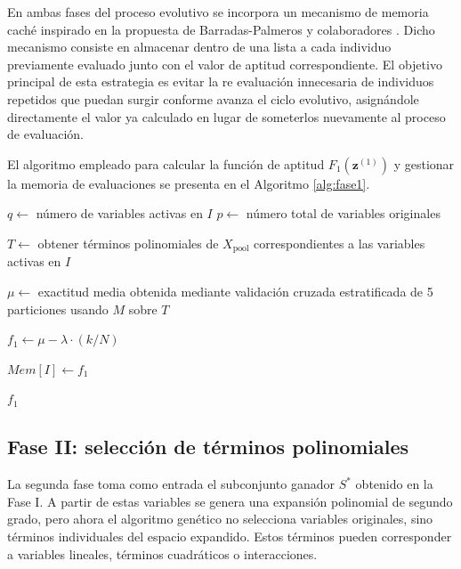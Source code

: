 En ambas fases del proceso evolutivo se incorpora un mecanismo de memoria caché inspirado en la propuesta de Barradas-Palmeros y colaboradores \cite{barradas2024computational}. Dicho mecanismo consiste en almacenar dentro de una lista a cada individuo previamente evaluado junto con el valor de aptitud correspondiente. El objetivo principal de esta estrategia es evitar la re evaluación innecesaria de individuos repetidos que puedan surgir conforme avanza el ciclo evolutivo, asignándole directamente el valor ya calculado en lugar de someterlos nuevamente al proceso de evaluación.

El algoritmo empleado para calcular la función de aptitud $F_1(\mathbf{z}^{(1)})$ y gestionar la memoria de evaluaciones se presenta en el Algoritmo \ref{alg:fase1}.


\begin{algorithm}[H]
		 		 
		
	
	$q \gets$ número de variables activas en $I$\;
	$p \gets$ número total de variables originales\;
	
	
	
	$T \gets$ obtener términos polinomiales de $X_{\text{pool}}$ correspondientes a las variables activas en $I$\;
	
	$\mu \gets$ exactitud media obtenida mediante validación cruzada estratificada de 5 particiones usando $M$ sobre $T$\;
	
	$f_1 \gets \mu - \lambda \cdot (k/N)$\;
	
	$Mem[I] \gets f_1$\;
	
	\Return $f_1$\;
	
	\caption{Evaluación de aptitud con expansión polinomial}
	\label{alg:fase1}
\end{algorithm}


\subsection{Fase II: selección de términos polinomiales}

La segunda fase toma como entrada el subconjunto ganador $S^*$ obtenido en la Fase I. A partir de estas variables se genera una expansión polinomial de segundo grado, pero ahora el  algoritmo genético no selecciona variables originales, sino términos individuales del espacio expandido. Estos términos pueden corresponder a variables lineales, términos cuadráticos o interacciones.

